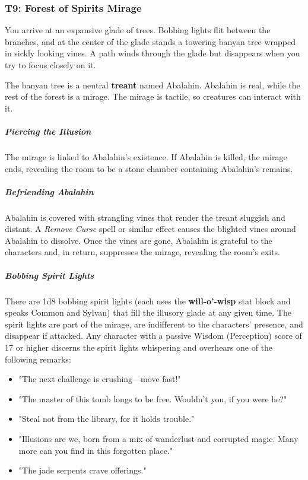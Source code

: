\documentclass[10pt,a4paper,twoside,bg=print,twocolumn,openany,nodeprecatedcode]{dndbook}
\begin{document}
\subsubsection{T9: Forest of Spirits Mirage}
\begin{DndReadAloud}{}
You arrive at an expansive glade of trees. Bobbing lights flit between the branches, and at the center of the glade stands a towering banyan tree wrapped in sickly looking vines. A path winds through the glade but disappears when you try to focus closely on it.

\end{DndReadAloud}

The banyan tree is a neutral \textbf{treant} named Abalahin. Abalahin is real, while the rest of the forest is a mirage. The mirage is tactile, so creatures can interact with it.

\subparagraph{Piercing the Illusion}
The mirage is linked to Abalahin's existence. If Abalahin is killed, the mirage ends, revealing the room to be a stone chamber containing Abalahin's remains.

\subparagraph{Befriending Abalahin}
Abalahin is covered with strangling vines that render the treant sluggish and distant. A \textit{Remove Curse} spell or similar effect causes the blighted vines around Abalahin to dissolve. Once the vines are gone, Abalahin is grateful to the characters and, in return, suppresses the mirage, revealing the room's exits.

\subparagraph{Bobbing Spirit Lights}
There are 1d8 bobbing spirit lights (each uses the \textbf{will-o'-wisp} stat block and speaks Common and Sylvan) that fill the illusory glade at any given time. The spirit lights are part of the mirage, are indifferent to the characters' presence, and disappear if attacked. Any character with a passive Wisdom (Perception) score of 17 or higher discerns the spirit lights whispering and overhears one of the following remarks:


\begin{itemize}
\item "The next challenge is crushing—move fast!"
\item "The master of this tomb longs to be free. Wouldn't you, if you were he?"
\item "Steal not from the library, for it holds trouble."
\item "Illusions are we, born from a mix of wanderlust and corrupted magic. Many more can you find in this forgotten place."
\item "The jade serpents crave offerings."
\end{itemize}
\end{document}
